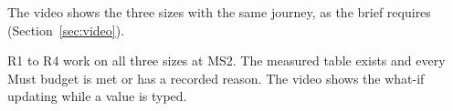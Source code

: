 The video shows the three sizes with the same journey, as the brief requires
(Section~\ref{sec:video}).

\begin{done}
R1 to R4 work on all three sizes at MS2. The measured table exists and every Must budget is met or
has a recorded reason. The video shows the what-if updating while a value is typed.
\end{done}
